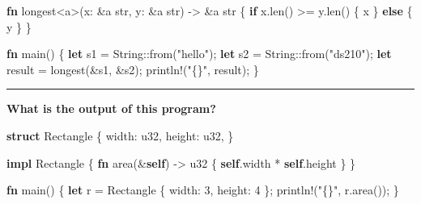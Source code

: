 \documentclass[
  11pt,
]{article}
\newenvironment{Shaded}{}{}
\newcommand{\ControlFlowTok}[1]{\textcolor[rgb]{0.00,0.44,0.13}{\textbf{#1}}}
\newcommand{\DataTypeTok}[1]{\textcolor[rgb]{0.56,0.13,0.00}{#1}}
\newcommand{\DecValTok}[1]{\textcolor[rgb]{0.25,0.63,0.44}{#1}}
\newcommand{\KeywordTok}[1]{\textcolor[rgb]{0.00,0.44,0.13}{\textbf{#1}}}
\newcommand{\NormalTok}[1]{#1}
\newcommand{\OperatorTok}[1]{\textcolor[rgb]{0.40,0.40,0.40}{#1}}
\newcommand{\OtherTok}[1]{\textcolor[rgb]{0.00,0.44,0.13}{#1}}
\newcommand{\PreprocessorTok}[1]{\textcolor[rgb]{0.74,0.48,0.00}{#1}}
\newcommand{\StringTok}[1]{\textcolor[rgb]{0.25,0.44,0.63}{#1}}
\begin{document}
\begin{Shaded}
\begin{Highlighting}[]
\KeywordTok{fn}\NormalTok{ longest}\OperatorTok{\textless{}}\OtherTok{\textquotesingle{}a}\OperatorTok{\textgreater{}}\NormalTok{(x}\OperatorTok{:} \OperatorTok{\&}\OtherTok{\textquotesingle{}a} \DataTypeTok{str}\OperatorTok{,}\NormalTok{ y}\OperatorTok{:} \OperatorTok{\&}\OtherTok{\textquotesingle{}a} \DataTypeTok{str}\NormalTok{) }\OperatorTok{{-}\textgreater{}} \OperatorTok{\&}\OtherTok{\textquotesingle{}a} \DataTypeTok{str} \OperatorTok{\{}
    \ControlFlowTok{if}\NormalTok{ x}\OperatorTok{.}\NormalTok{len() }\OperatorTok{\textgreater{}=}\NormalTok{ y}\OperatorTok{.}\NormalTok{len() }\OperatorTok{\{}\NormalTok{ x }\OperatorTok{\}} \ControlFlowTok{else} \OperatorTok{\{}\NormalTok{ y }\OperatorTok{\}}
\OperatorTok{\}}

\KeywordTok{fn}\NormalTok{ main() }\OperatorTok{\{}
    \KeywordTok{let}\NormalTok{ s1 }\OperatorTok{=} \DataTypeTok{String}\PreprocessorTok{::}\NormalTok{from(}\StringTok{"hello"}\NormalTok{)}\OperatorTok{;}
    \KeywordTok{let}\NormalTok{ s2 }\OperatorTok{=} \DataTypeTok{String}\PreprocessorTok{::}\NormalTok{from(}\StringTok{"ds210"}\NormalTok{)}\OperatorTok{;}
    \KeywordTok{let}\NormalTok{ result }\OperatorTok{=}\NormalTok{ longest(}\OperatorTok{\&}\NormalTok{s1}\OperatorTok{,} \OperatorTok{\&}\NormalTok{s2)}\OperatorTok{;}
    \PreprocessorTok{println!}\NormalTok{(}\StringTok{"\{\}"}\OperatorTok{,}\NormalTok{ result)}\OperatorTok{;}
\OperatorTok{\}}
\end{Highlighting}
\end{Shaded}

\begin{center}\rule{0.5\linewidth}{0.5pt}\end{center}

\textbf{What is the output of this program?}

\begin{Shaded}
\begin{Highlighting}[]
\KeywordTok{struct}\NormalTok{ Rectangle }\OperatorTok{\{}
\NormalTok{    width}\OperatorTok{:} \DataTypeTok{u32}\OperatorTok{,}
\NormalTok{    height}\OperatorTok{:} \DataTypeTok{u32}\OperatorTok{,}
\OperatorTok{\}}

\KeywordTok{impl}\NormalTok{ Rectangle }\OperatorTok{\{}
    \KeywordTok{fn}\NormalTok{ area(}\OperatorTok{\&}\KeywordTok{self}\NormalTok{) }\OperatorTok{{-}\textgreater{}} \DataTypeTok{u32} \OperatorTok{\{}
        \KeywordTok{self}\OperatorTok{.}\NormalTok{width }\OperatorTok{*} \KeywordTok{self}\OperatorTok{.}\NormalTok{height}
    \OperatorTok{\}}
\OperatorTok{\}}

\KeywordTok{fn}\NormalTok{ main() }\OperatorTok{\{}
    \KeywordTok{let}\NormalTok{ r }\OperatorTok{=}\NormalTok{ Rectangle }\OperatorTok{\{}\NormalTok{ width}\OperatorTok{:} \DecValTok{3}\OperatorTok{,}\NormalTok{ height}\OperatorTok{:} \DecValTok{4} \OperatorTok{\};}
    \PreprocessorTok{println!}\NormalTok{(}\StringTok{"\{\}"}\OperatorTok{,}\NormalTok{ r}\OperatorTok{.}\NormalTok{area())}\OperatorTok{;}
\OperatorTok{\}}
\end{Highlighting}
\end{Shaded}
\end{document}
